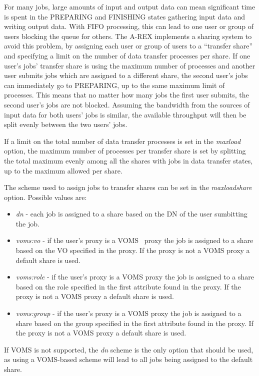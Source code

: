 \documentclass{article}                            %
\begin{document}
For many jobs, large amounts of input and output data can mean
significant time is spent in the PREPARING and FINISHING states
gathering input data and writing output data. With FIFO processing,
this can lead to one user or group of users blocking the queue for
others. The A-REX implements a sharing system to avoid this problem, by
assigning each user or group of users to a ``transfer share'' and
specifying a limit on the number of data transfer processes per
share. If one user's jobs' transfer share is using the maximum number
of processes and another user submits jobs which are assigned to a
different share, the second user's jobs can immediately go to
PREPARING, up to the same maximum limit of processes. This means that
no matter how many jobs the first user submits, the second user's jobs
are not blocked. Assuming the bandwidth from the sources of input data
for both users' jobs is similar, the available throughput will then be
split evenly between the two users' jobs.

If a limit on the total number of data transfer processes is set in
the \emph{maxload} option, the maximum number of processes per
transfer share is set by splitting the total maximum evenly among all
the shares with jobs in data transfer states, up to the maximum
allowed per share.

The scheme used to assign jobs to transfer shares can be set in the
\emph{maxloadshare} option. Possible values are:

\begin{itemize}
\item \emph{dn} - each job is assigned to a share based on the DN of
  the user sumbitting the job.
\item \emph{voms:vo} - if the user's proxy is a VOMS~\cite{voms} proxy
  the job is assigned to a share based on the VO specified in the
  proxy. If the proxy is not a VOMS proxy a default share is used.
\item \emph{voms:role} - if the user's proxy is a VOMS proxy the job
  is assigned to a share based on the role specified in the first
  attribute found in the proxy. If the proxy is not a VOMS proxy a
  default share is used.
\item \emph{voms:group} - if the user's proxy is a VOMS proxy the job is
  assigned to a share based on the group specified in the first
  attribute found in the proxy. If the proxy is not a VOMS proxy a
  default share is used.
\end{itemize}

If VOMS is not supported, the \emph{dn} scheme is the only option that
should be used, as using a VOMS-based scheme will lead to all jobs
being assigned to the default share.
\end{document}
